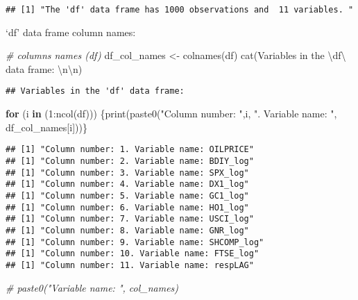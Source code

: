 \documentclass[
]{article}
\newenvironment{Shaded}{\begin{snugshade}}{\end{snugshade}}
\newcommand{\CommentTok}[1]{\textcolor[rgb]{0.56,0.35,0.01}{\textit{#1}}}
\newcommand{\ControlFlowTok}[1]{\textcolor[rgb]{0.13,0.29,0.53}{\textbf{#1}}}
\newcommand{\DecValTok}[1]{\textcolor[rgb]{0.00,0.00,0.81}{#1}}
\newcommand{\FunctionTok}[1]{\textcolor[rgb]{0.00,0.00,0.00}{#1}}
\newcommand{\NormalTok}[1]{#1}
\newcommand{\OtherTok}[1]{\textcolor[rgb]{0.56,0.35,0.01}{#1}}
\newcommand{\SpecialCharTok}[1]{\textcolor[rgb]{0.00,0.00,0.00}{#1}}
\newcommand{\StringTok}[1]{\textcolor[rgb]{0.31,0.60,0.02}{#1}}
\begin{document}
\begin{verbatim}
## [1] "The 'df' data frame has 1000 observations and  11 variables. "
\end{verbatim}

`df' data frame column names:

\begin{Shaded}
\begin{Highlighting}[]
\CommentTok{\# columns names (df)}
\NormalTok{df\_col\_names }\OtherTok{\textless{}{-}} \FunctionTok{colnames}\NormalTok{(df)}
\FunctionTok{cat}\NormalTok{(}\StringTok{\textquotesingle{}Variables in the }\SpecialCharTok{\textbackslash{}\textquotesingle{}}\StringTok{df}\SpecialCharTok{\textbackslash{}\textquotesingle{}}\StringTok{ data frame: }\SpecialCharTok{\textbackslash{}n\textbackslash{}n}\StringTok{\textquotesingle{}}\NormalTok{)}
\end{Highlighting}
\end{Shaded}

\begin{verbatim}
## Variables in the 'df' data frame:
\end{verbatim}

\begin{Shaded}
\begin{Highlighting}[]
\ControlFlowTok{for}\NormalTok{ (i }\ControlFlowTok{in}\NormalTok{ (}\DecValTok{1}\SpecialCharTok{:}\FunctionTok{ncol}\NormalTok{(df))) \{}\FunctionTok{print}\NormalTok{(}\FunctionTok{paste0}\NormalTok{(}\StringTok{"Column number: "}\NormalTok{,i, }\StringTok{". Variable name: "}\NormalTok{, df\_col\_names[i]))\}}
\end{Highlighting}
\end{Shaded}

\begin{verbatim}
## [1] "Column number: 1. Variable name: OILPRICE"
## [1] "Column number: 2. Variable name: BDIY_log"
## [1] "Column number: 3. Variable name: SPX_log"
## [1] "Column number: 4. Variable name: DX1_log"
## [1] "Column number: 5. Variable name: GC1_log"
## [1] "Column number: 6. Variable name: HO1_log"
## [1] "Column number: 7. Variable name: USCI_log"
## [1] "Column number: 8. Variable name: GNR_log"
## [1] "Column number: 9. Variable name: SHCOMP_log"
## [1] "Column number: 10. Variable name: FTSE_log"
## [1] "Column number: 11. Variable name: respLAG"
\end{verbatim}

\begin{Shaded}
\begin{Highlighting}[]
\CommentTok{\# paste0("Variable name: ", col\_names)}
\end{Highlighting}
\end{Shaded}
\end{document}
